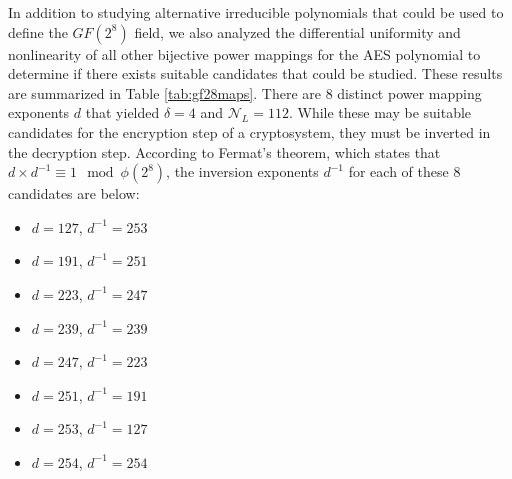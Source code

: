 In addition to studying alternative irreducible polynomials that could be used to define the $GF(2^8)$ field, we also analyzed the differential uniformity and nonlinearity of all other bijective power mappings for the AES polynomial to determine if there exists suitable candidates that could be studied. These results are summarized in Table \ref{tab:gf28maps}. There are $8$ distinct power mapping exponents $d$ that yielded $\delta = 4$ and $\mathcal{N}_L = 112$. While these may be suitable candidates for the encryption step of a cryptosystem, they must be inverted in the decryption step. According to Fermat's theorem, which states that $d \times d^{-1} \equiv 1 \mod \phi(2^8)$, the inversion exponents $d^{-1}$ for each of these $8$ candidates are below:
\begin{itemize}
 \itemsep0em
    \item $d = 127$, $d^{-1} = 253$
    \item $d = 191$, $d^{-1} = 251$
    \item $d = 223$, $d^{-1} = 247$
    \item $d = 239$, $d^{-1} = 239$
    \item $d = 247$, $d^{-1} = 223$
    \item $d = 251$, $d^{-1} = 191$
    \item $d = 253$, $d^{-1} = 127$
    \item $d = 254$, $d^{-1} = 254$
\end{itemize}

